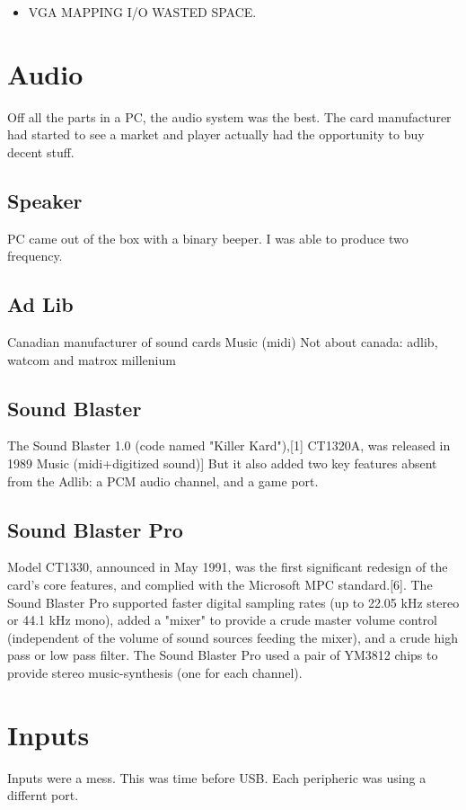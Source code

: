 \documentclass[book.tex]{subfiles}
\begin{document}
\begin{itemize}
\item VGA MAPPING I/O WASTED SPACE.

\end{itemize}





  

\section{Audio}
Off all the parts in a PC, the audio system was the best. The card manufacturer had started to see a market and player actually had the opportunity to buy decent stuff.
  \subsection{Speaker}
  PC came out of the box with a binary beeper. I was able to produce two frequency.
  \subsection{Ad Lib}
  Canadian manufacturer of sound cards
  Music (midi)
  Not about canada: adlib, watcom and matrox millenium
  \subsection{Sound Blaster}
  The Sound Blaster 1.0 (code named "Killer Kard"),[1] CT1320A, was released in 1989
  Music (midi+digitized sound)]  But it also added two key features absent from the Adlib: a PCM audio channel, and a game port.
  \subsection{Sound Blaster Pro}
  Model CT1330, announced in May 1991, was the first significant redesign of the card's core features, and complied with the Microsoft MPC standard.[6]. The Sound Blaster Pro supported faster digital sampling rates (up to 22.05 kHz stereo or 44.1 kHz mono), added a "mixer" to provide a crude master volume control (independent of the volume of sound sources feeding the mixer), and a crude high pass or low pass filter. The Sound Blaster Pro used a pair of YM3812 chips to provide stereo music-synthesis (one for each channel).
\section{Inputs}
Inputs were a mess. This was time before USB. Each peripheric was using a differnt port.
\end{document}
